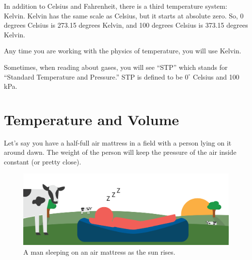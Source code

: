 In addition to Celsius and Fahrenheit, there is a third temperature system: Kelvin. Kelvin has the same scale as Celsius, but it starts at absolute zero.
So, 0 degrees Celsius is 273.15 degrees Kelvin, and 100 degrees Celsius is 373.15 degrees Kelvin.

Any time you are working with the physics of temperature, you will use Kelvin.

Sometimes, when reading about gases, you will see ``STP'' which stands for ``Standard Temperature and Pressure.'' STP is defined to be $0^\circ$ Celsius and 100 kPa.

\section{Temperature and Volume}

Let's say you have a half-full air mattress in a field with a person lying on it around dawn. The weight of the person will keep the pressure of the air inside constant (or pretty close). 
\begin{figure}[htbp]
    \centering
    \includegraphics[width=\textwidth]{airMattress1.png}
    \caption{A man sleeping on an air mattress as the sun rises.}
    \label{fig:airMattress1}
\end{figure}


